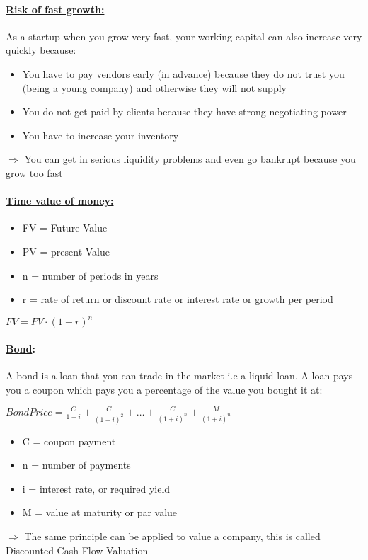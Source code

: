 \documentclass[8pt]{extreport}
\begin{document}
{\paragraph{\underline{Risk of fast growth:}} As a startup when you grow very fast, your working capital can also increase very quickly because:
\begin{itemize}
\item You have to pay vendors early (in advance) because they do not trust you (being a young company) and otherwise they will not supply
\item You do not get paid by clients because they have strong negotiating power
\item You have to increase your inventory
\end{itemize}
$\Rightarrow$ You can get in serious liquidity problems and even go bankrupt because you grow too fast

\paragraph{\underline{Time value of money:}}
\begin{itemize}
\item FV = Future Value
\item PV = present Value
\item n = number of periods in years
\item r = rate of return or discount rate or interest rate or growth per period
\end{itemize}
\begin{center}
$ FV = PV \cdot (1 + r)^n$
\end{center}
\paragraph{\underline{Bond}:} A bond is a loan that you can trade in the market i.e a liquid loan. A loan pays you a coupon which pays you a percentage of the value you bought it at:
\begin{center}
$ Bond Price = \frac{C}{1+i} + \frac{C}{(1 + i)^2} + \dots +\frac{C}{(1+i)^n} + \frac{M}{(1+i)^n}$
\end{center}
\begin{itemize}
\item C = coupon payment
\item n = number of payments
\item i = interest rate, or required yield
\item M = value at maturity or par value
\end{itemize}
$\Rightarrow$ The same principle can be applied to value a company, this is called Discounted Cash Flow Valuation
}
\end{document}
